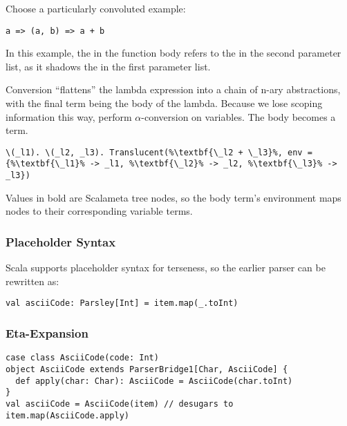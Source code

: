 \documentclass[../../main.tex]{subfiles}
\begin{document}
Choose a particularly convoluted example:
\begin{verbatim}
a => (a, b) => a + b
\end{verbatim}
In this example, the  in the function body refers to the  in the second parameter list, as it shadows the  in the first parameter list.

Conversion ``flattens'' the lambda expression into a chain of n-ary abstractions, with the final term being the body of the lambda.
Because we lose scoping information this way, perform $\alpha$-conversion on variables.
The body becomes a  term.

\begin{lstlisting}
\(_l1). \(_l2, _l3). Translucent(%\textbf{\_l2 + \_l3}%, env = {%\textbf{\_l1}% -> _l1, %\textbf{\_l2}% -> _l2, %\textbf{\_l3}% -> _l3})
\end{lstlisting}
Values in bold are Scalameta tree nodes, so the body term's environment maps  nodes to their corresponding variable terms.

\subsubsection{Placeholder Syntax}
Scala supports placeholder syntax for terseness, so the earlier parser can be rewritten as:
\begin{verbatim}
val asciiCode: Parsley[Int] = item.map(_.toInt)
\end{verbatim}

\subsubsection{Eta-Expansion}
\begin{verbatim}
case class AsciiCode(code: Int)
object AsciiCode extends ParserBridge1[Char, AsciiCode] {
  def apply(char: Char): AsciiCode = AsciiCode(char.toInt)
}
val asciiCode = AsciiCode(item) // desugars to item.map(AsciiCode.apply)
\end{verbatim}
\end{document}
